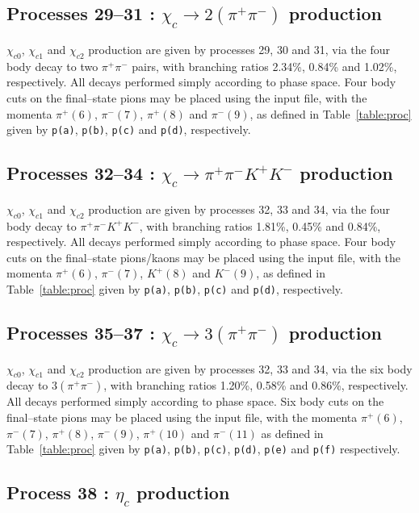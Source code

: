 \documentclass[12pt]{article}
\begin{document}
\subsection{Processes 29--31 : $\chi_c \to 2(\pi^+\pi^-)$ production}

$\chi_{c0}$, $\chi_{c1}$ and $\chi_{c2}$ production are given by processes 29, 30 and 31, via the four body decay to two $\pi^+\pi^-$ pairs, with 
branching ratios 2.34\%, 0.84\% and 1.02\%, respectively. All decays performed simply according to phase space. Four body cuts on the final--state 
pions may be placed using the input file, with the momenta $\pi^+(6)$, $\pi^-(7)$, $\pi^+(8)$ and $\pi^-(9)$, as defined in Table~\ref{table:proc} 
given by \texttt{p(a)}, \texttt{p(b)}, \texttt{p(c)} and \texttt{p(d)}, respectively.

\subsection{Processes 32--34 : $\chi_c \to \pi^+\pi^-K^+K^-$ production}

$\chi_{c0}$, $\chi_{c1}$ and $\chi_{c2}$ production are given by processes 32, 33 and 34, via the four body decay to $\pi^+\pi^-K^+K^-$, with branching 
ratios 1.81\%, 0.45\% and 0.84\%, respectively. All decays performed simply according to phase space. Four body cuts on the final--state pions/kaons may
 be placed using the input file, with the momenta $\pi^+(6)$, $\pi^-(7)$, $K^+(8)$ and $K^-(9)$, as defined in Table~\ref{table:proc} given by 
 \texttt{p(a)}, \texttt{p(b)}, \texttt{p(c)} and \texttt{p(d)}, respectively.

\subsection{Processes 35--37 : $\chi_c \to 3(\pi^+\pi^-)$ production}

$\chi_{c0}$, $\chi_{c1}$ and $\chi_{c2}$ production are given by processes 32, 33 and 34,  via the six body decay to $3(\pi^+\pi^-)$, with branching 
ratios 1.20\%, 0.58\% and 0.86\%, respectively. All decays performed simply according to phase space. Six body cuts on the final--state pions may be
 placed using the input file, with the momenta $\pi^+(6)$,  $\pi^-(7)$, $\pi^+(8)$, $\pi^-(9)$, $\pi^+(10)$ and $\pi^-(11)$ as defined in 
 Table~\ref{table:proc} given by \texttt{p(a)}, \texttt{p(b)}, \texttt{p(c)}, \texttt{p(d)}, \texttt{p(e)} and \texttt{p(f)} respectively.

\subsection{Process 38 : $\eta_c$ production}
\end{document}
